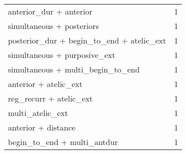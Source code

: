 \begin{table}[htbp!]
\begin{tabular}{lr}
anterior\_dur + anterior                   &         1 \\
simultaneous + posteriors                 &         1 \\
posterior\_dur + begin\_to\_end + atelic\_ext &         1 \\
simultaneous + purposive\_ext              &         1 \\
simultaneous + multi\_begin\_to\_end         &         1 \\
anterior + atelic\_ext                     &         1 \\
reg\_recurr + atelic\_ext                   &         1 \\
multi\_atelic\_ext                          &         1 \\
anterior + distance                       &         1 \\
begin\_to\_end + multi\_antdur               &         1 \\
\bottomrule
\end{tabular}
\end{table}
